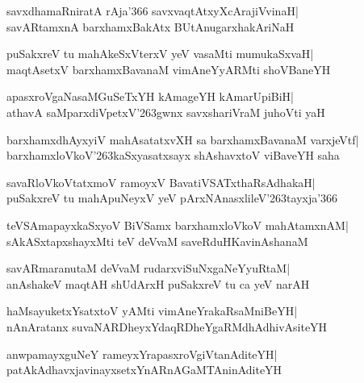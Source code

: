 \documentclass[twoside,12pt,openright]{book}
\def\S{\char'263}
\newcounter{shloka}[chapter]
\begin{document}
\begin{shloka}%
savxdhamaRniratA rAja\char'366 savxvaqtAtxyXcArajiVvinaH|\\
savARtamxnA barxhamxBakAtx BUtAnugarxhakAriNaH
\end{shloka}

\begin{shloka}%
puSakxreV tu mahAkeSxVterxV yeV vasaMti mumukaSxvaH|\\
maqtAsetxV barxhamxBavanaM vimAneYyARMti shoVBaneYH
\end{shloka}

\begin{shloka}%
apasxroVgaNasaMGuSeTxYH kAmageYH kAmarUpiBiH|\\
athavA saMparxdiVpetxV\S gwnx savxshariVraM juhoVti yaH
\end{shloka}

\begin{shloka}%
barxhamxdhAyxyiV mahAsatatxvXH sa barxhamxBavanaM varxjeVtf|\\
barxhamxloVkoV\S kaSxyasatxsayx shAshavxtoV viBaveYH saha
\end{shloka}

\begin{shloka}%
savaRloVkoVtatxmoV ramoyxV BavatiVSATxthaRsAdhakaH|\\
puSakxreV tu mahApuNeyxV yeV pArxNAnasxlileV\S tayxja\char'366
\end{shloka}

\begin{shloka}%
teVSAmapayxkaSxyoV BiVSamx barxhamxloVkoV mahAtamxnAM|\\
sAkASxtapxshayxMti teV deVvaM saveRduHKavinAshanaM
\end{shloka}

\begin{shloka}%
savARmaranutaM deVvaM rudarxviSuNxgaNeYyuRtaM|\\
anAshakeV maqtAH shUdArxH puSakxreV tu ca yeV narAH
\end{shloka}

\begin{shloka}%
haMsayuketxYsatxtoV yAMti vimAneYrakaRsaMniBeYH|\\
nAnAratanx suvaNARDheyxYdaqRDheYgaRMdhAdhivAsiteYH
\end{shloka}

\begin{shloka}%
anwpamayxguNeY rameyxYrapasxroVgiVtanAditeYH|\\
patAkAdhavxjavinayxsetxYnARnAGaMTAninAditeYH
\end{shloka}
\end{document}
